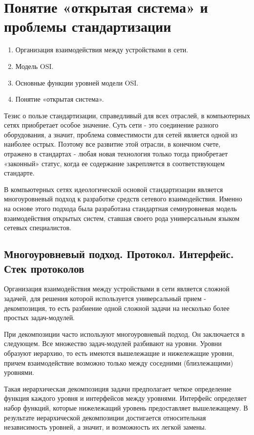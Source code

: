 \chapter{Понятие «открытая система» и проблемы стандартизации}

\begin{enumerate}
    \item Организация взаимодействия между устройствами в сети.
    \item Модель OSI.
    \item Основные функции уровней модели OSI.
    \item Понятие «открытая система».
\end{enumerate}

Тезис о пользе стандартизации, справедливый для всех отраслей, в компьютерных сетях приобретает особое значение.
Суть сети - это соединение разного оборудования, а значит, проблема совместимости для сетей является одной из наиболее острых.
Поэтому все развитие этой отрасли, в конечном счете, отражено в стандартах - любая новая технология только тогда приобретает «законный» статус, когда ее содержание закрепляется в соответствующем стандарте.

В компьютерных сетях идеологической основой стандартизации является многоуровневый подход к разработке средств сетевого взаимодействия.
Именно на основе этого подхода была разработана стандартная семиуровневая модель взаимодействия открытых систем, ставшая своего рода универсальным языком сетевых специалистов.

\section{Многоуровневый подход. Протокол. Интерфейс. Стек протоколов}

Организация взаимодействия между устройствами в сети является сложной задачей, для решения которой используется универсальный прием - декомпозиция, то есть разбиение одной сложной задачи на несколько более простых задач-модулей.

При декомпозиции часто используют многоуровневый подход.
Он заключается в следующем.
Все множество задач-модулей разбивают на уровни.
Уровни образуют иерархию, то есть имеются вышележащие и нижележащие уровни, причем взаимодействие возможно только между соседними (близлежащими) уровнями.

Такая иерархическая декомпозиция задачи предполагает четкое определение функция каждого уровня и интерфейсов между уровнями.
Интерфейс определяет набор функций, которые нижележащий уровень предоставляет вышележащему.
В результате иерархической декомпозиции достигается относительная независимость уровней, а значит, и возможность их легкой замены.

